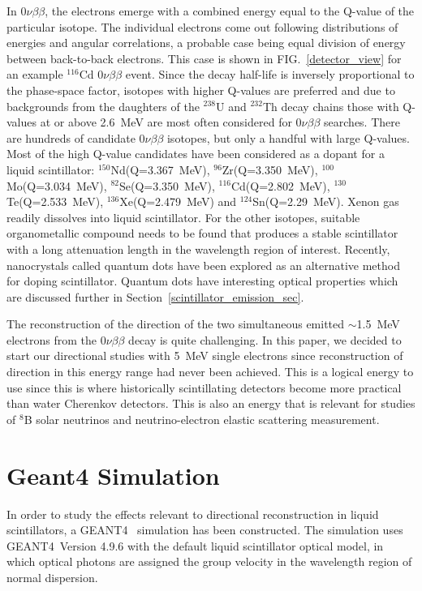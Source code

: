 \documentclass[aps,prc,twocolumn,groupedaddress,showpacs,amsmath,amssymb,floatfix,superscriptaddress]{revtex4}
\newcommand{\GEANT}{GEANT4}
\begin{document}
In $0\nu\beta\beta$, the electrons emerge with a combined energy equal
to the Q-value of the particular isotope. The individual
electrons come out following distributions of energies and angular correlations, 
a probable case being equal division of energy between back-to-back
electrons\cite{phasespace}. This case is shown in FIG.~\ref{detector_view}
for an example $^{116}$Cd $0\nu\beta\beta$ event. Since the decay
half-life is inversely proportional to the phase-space factor, isotopes with
higher Q-values are preferred and due to backgrounds from the daughters
of the $^{238}$U and $^{232}$Th decay chains those with Q-values at or
above 2.6~MeV are most often considered for $0\nu\beta\beta$ searches.
There are hundreds of candidate $0\nu\beta\beta$ isotopes\cite{tabledbb},
but only a handful with large Q-values.  Most of the high Q-value candidates
have been considered as a dopant for a liquid scintillator:
$^{150}$Nd(Q=3.367~MeV)\cite{minfang,nd1}, $^{96}$Zr(Q=3.350~MeV)\cite{zr1},
$^{100}$Mo(Q=3.034~MeV)\cite{mo1}, $^{82}$Se(Q=3.350~MeV)\cite{qdot},
$^{116}$Cd(Q=2.802~MeV)\cite{qdot, cd1}, $^{130}$Te(Q=2.533~MeV)\cite{qdot, biller},
$^{136}$Xe(Q=2.479~MeV)\cite{KZ0nu} and $^{124}$Sn(Q=2.29~MeV)\cite{sn1}.
Xenon gas readily dissolves into liquid scintillator. For the other isotopes,
suitable organometallic compound needs to be found that produces a stable
scintillator with a long attenuation length in the wavelength region of
interest. Recently, nanocrystals called quantum dots have been explored
as an alternative method for doping scintillator\cite{qdot,qdot2}. Quantum dots
have interesting optical properties which are discussed further
in Section~\ref{scintillator_emission_sec}.

The reconstruction of the direction of the two simultaneous
emitted $\sim$1.5~MeV electrons from the $0\nu\beta\beta$ decay is
quite challenging. In this paper, we decided to start our directional
studies with 5~MeV single electrons since reconstruction of direction
in this energy range had never been achieved. This is a logical
energy to use since this is where historically scintillating detectors
become more practical than water Cherenkov detectors. This is also
an energy that is relevant for studies of $^{8}$B solar neutrinos
and neutrino-electron elastic scattering measurement.

\section{Geant4 Simulation}
In order to study the effects relevant to directional reconstruction
in liquid scintillators, a
\GEANT~\cite{geant4one,geant4two} simulation has been constructed. The 
simulation uses \GEANT~Version 4.9.6 with the default liquid scintillator optical model, in which optical photons are
assigned the group velocity in the wavelength region of normal
dispersion.
\end{document}
